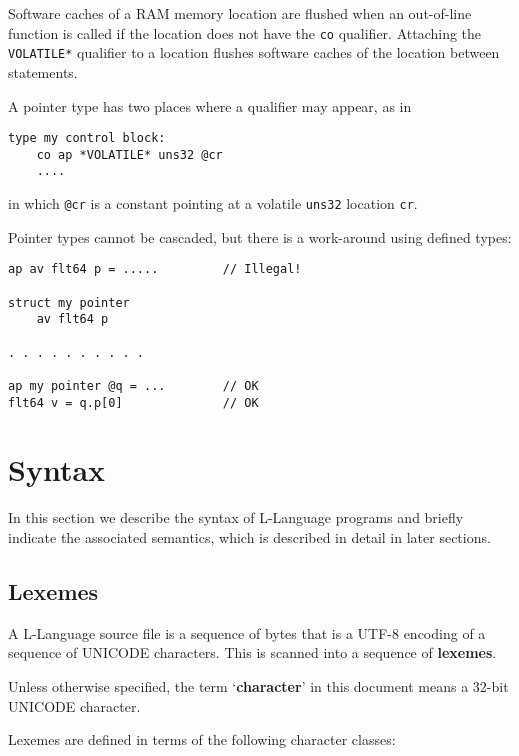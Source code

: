 \documentclass[12pt]{article}
\newcommand{\key}[1]{{\rm \bfseries #1}}
\newcommand{\skey}[2]{{\rm \bfseries #1#2}}
\newenvironment{indpar}[1][0.3in]%
	{\begin{list}{}%
		     {\setlength{\itemsep}{0in}%
		      \setlength{\topsep}{0in}%
		      \setlength{\parsep}{1ex}%
		      \setlength{\labelwidth}{#1}%
		      \setlength{\leftmargin}{#1}%
		      \addtolength{\leftmargin}{\labelsep}}%
	 \item}%
	{\end{list}}
\begin{document}
Software caches of a RAM memory location are flushed when an out-of-line
function is called if the location does not have the {\tt co} qualifier.
Attaching the {\tt *VOLATILE*} qualifier to a location
flushes software caches of the location between statements.

A pointer type
has two places where a qualifier may appear, as in

\begin{indpar}\begin{verbatim}
type my control block:
    co ap *VOLATILE* uns32 @cr
    ....
\end{verbatim}\end{indpar}
in which {\tt @cr} is a constant pointing at a volatile
{\tt uns32} location {\tt cr}.

Pointer types cannot be cascaded, but there is a work-around
using defined types:
\begin{indpar}\begin{verbatim}
ap av flt64 p = .....         // Illegal!

struct my pointer
    av flt64 p

. . . . . . . . . .

ap my pointer @q = ...        // OK
flt64 v = q.p[0]              // OK
\end{verbatim}\end{indpar}


\section{Syntax}

In this section we describe the syntax of L-Language programs
and briefly indicate the associated semantics, which is
described in detail in later sections.

\subsection{Lexemes}
\label{LEXEMES}

A L-Language source file is a sequence of bytes that is a UTF-8 encoding
of a sequence of UNICODE characters.  This is scanned into a sequence
of \skey{lexeme}s.

Unless otherwise specified, the term `\key{character}' in this
document means a 32-bit UNICODE character.

Lexemes are defined in terms of
the following character classes:
\end{document}
